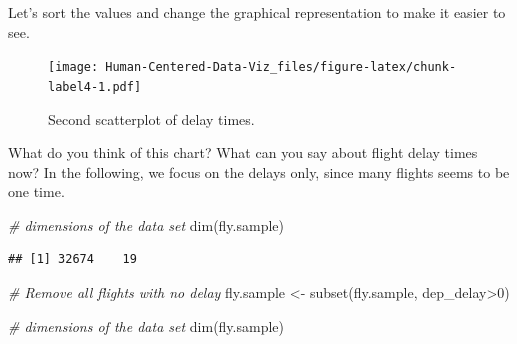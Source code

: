 \documentclass[
]{book}
\newenvironment{Shaded}{\begin{snugshade}}{\end{snugshade}}
\newcommand{\AttributeTok}[1]{\textcolor[rgb]{0.77,0.63,0.00}{#1}}
\newcommand{\CommentTok}[1]{\textcolor[rgb]{0.56,0.35,0.01}{\textit{#1}}}
\newcommand{\DecValTok}[1]{\textcolor[rgb]{0.00,0.00,0.81}{#1}}
\newcommand{\FunctionTok}[1]{\textcolor[rgb]{0.00,0.00,0.00}{#1}}
\newcommand{\NormalTok}[1]{#1}
\newcommand{\OtherTok}[1]{\textcolor[rgb]{0.56,0.35,0.01}{#1}}
\newcommand{\SpecialCharTok}[1]{\textcolor[rgb]{0.00,0.00,0.00}{#1}}
\newcommand{\StringTok}[1]{\textcolor[rgb]{0.31,0.60,0.02}{#1}}
\begin{document}
Let's sort the values and change the graphical representation to make it easier to see.

\begin{Shaded}
\end{Shaded}

\begin{figure}
\centering
\texttt{[image: Human-Centered-Data-Viz\_files/figure-latex/chunk-label4-1.pdf]}
\caption{\label{fig:chunk-label4}Second scatterplot of delay times.}
\end{figure}

What do you think of this chart? What can you say about flight delay times now? In the following, we focus on the delays only, since many flights seems to be one time.

\begin{Shaded}
\begin{Highlighting}[]
\CommentTok{\# dimensions of the data set}
\FunctionTok{dim}\NormalTok{(fly.sample)}
\end{Highlighting}
\end{Shaded}

\begin{verbatim}
## [1] 32674    19
\end{verbatim}

\begin{Shaded}
\begin{Highlighting}[]
\CommentTok{\# Remove all flights with no delay}
\NormalTok{fly.sample }\OtherTok{\textless{}{-}} \FunctionTok{subset}\NormalTok{(fly.sample, dep\_delay}\SpecialCharTok{\textgreater{}}\DecValTok{0}\NormalTok{)}

\CommentTok{\# dimensions of the data set}
\FunctionTok{dim}\NormalTok{(fly.sample)}
\end{Highlighting}
\end{Shaded}
\end{document}
